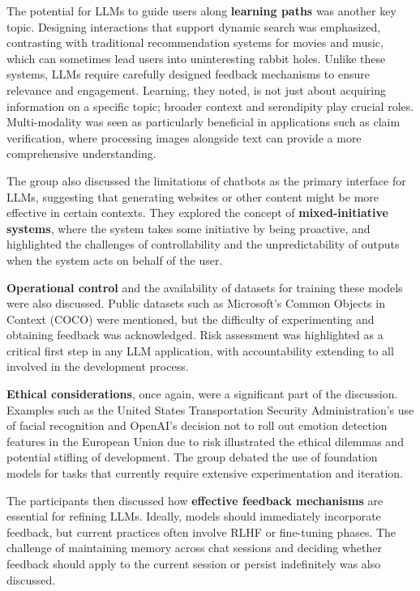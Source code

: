 \documentclass[11pt,dvipdfm]{article}
\begin{document}
The potential for LLMs to guide users along {\bf learning paths} was another key topic. Designing interactions that support dynamic search was emphasized, contrasting with traditional recommendation systems for movies and music, which can sometimes lead users into uninteresting rabbit holes. Unlike these systems, LLMs require carefully designed feedback mechanisms to ensure relevance and engagement. Learning, they noted, is not just about acquiring information on a specific topic; broader context and serendipity play crucial roles. Multi-modality was seen as particularly beneficial in applications such as claim verification, where processing images alongside text can provide a more comprehensive understanding.

The group also discussed the limitations of chatbots as the primary interface for LLMs, suggesting that generating websites or other content might be more effective in certain contexts. They explored the concept of {\bf mixed-initiative systems}, where the system takes some initiative by being proactive, and highlighted the challenges of controllability and the unpredictability of outputs when the system acts on behalf of the user.

{\bf Operational control} and the availability of datasets for training these models were also discussed. Public datasets such as Microsoft's Common Objects in Context (COCO) \cite{lin2014microsoft} were mentioned, but the difficulty of experimenting and obtaining feedback was acknowledged. Risk assessment was highlighted as a critical first step in any LLM application, with accountability extending to all involved in the development process.

{\bf Ethical considerations}, once again, were a significant part of the discussion. Examples such as the United States Transportation Security Administration's use of facial recognition and OpenAI's decision not to roll out emotion detection features in the European Union due to risk illustrated the ethical dilemmas and potential stifling of development. The group debated the use of foundation models for tasks that currently require extensive experimentation and iteration.

The participants then discussed how {\bf effective feedback mechanisms} are essential for refining LLMs. Ideally, models should immediately incorporate feedback, but current practices often involve RLHF or fine-tuning phases. The challenge of maintaining memory across chat sessions and deciding whether feedback should apply to the current session or persist indefinitely was also discussed.
\end{document}
